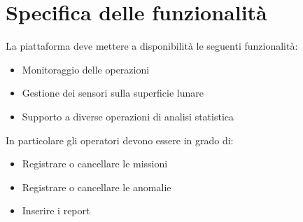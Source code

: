 \section{Specifica delle funzionalità}
La piattaforma deve mettere a disponibilità le seguenti funzionalità:
\begin{itemize}
  \item Monitoraggio delle operazioni
  \item Gestione dei sensori sulla superficie lunare
  \item Supporto a diverse operazioni di analisi statistica
\end{itemize}
In particolare gli operatori devono essere in grado di:
\begin{itemize}
  \item Registrare o cancellare le missioni
  \item Registrare o cancellare le anomalie
  \item Inserire i report
\end{itemize}

